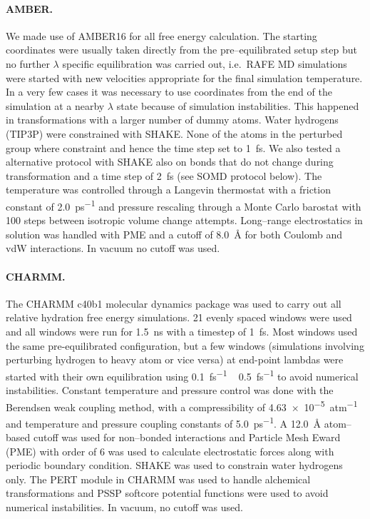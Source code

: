\documentclass[journal=jctcce,manuscript=article]{achemso}
\begin{document}
\paragraph{AMBER.} We made use of AMBER16 for all free energy calculation. The 
starting coordinates were usually taken directly from the pre--equilibrated 
setup step but no further $\lambda$ specific equilibration  was carried out, 
i.e.\ RAFE MD simulations were started with new velocities appropriate for the 
final simulation temperature.  In a very few cases it was necessary to use 
coordinates from the end of the simulation at a nearby $\lambda$ state because 
of simulation instabilities. This happened in transformations with a larger 
number of dummy atoms.  Water hydrogens (TIP3P) were constrained with SHAKE. 
None of the atoms in the perturbed group where constraint and hence the time 
step set to \SI{1}{fs}.  We also tested a alternative protocol with 
SHAKE also on bonds that do not change during transformation and a time step of 
\SI{2}{fs} (see SOMD protocol below). The temperature was controlled through a 
Langevin thermostat with a friction constant of \SI{2.0}{ps^{-1}} and pressure 
rescaling through a Monte Carlo barostat with 100 steps between isotropic 
volume change attempts.  Long--range electrostatics in solution was handled 
with PME and a cutoff of \SI{8.0}{\angstrom} for both Coulomb and vdW 
interactions.  In vacuum no cutoff was used.

\paragraph{CHARMM.} The CHARMM c40b1 molecular dynamics package was used to 
carry out all relative hydration free energy simulations.  21 evenly spaced 
windows were used and all windows were run for \SI{1.5}{ns} with a timestep of 
\SI{1}{fs}.  Most windows used the same pre-equilibrated configuration, but a 
few windows (simulations involving perturbing hydrogen to heavy atom or vice
versa) at end-point lambdas were started with their own equilibration using
\SI{0.1}{fs^{-1}} ~ \SI{0.5}{fs^{-1}} to avoid numerical instabilities.
 Constant temperature and pressure control was done with the Berendsen weak coupling method, with a 
compressibility of \SI{4.63e-5}{atm^{-1}} and temperature and pressure coupling 
constants of \SI{5.0}{ps^{-1}}.  A \SI{12.0}{\angstrom} atom--based cutoff was 
used for non--bonded interactions and Particle Mesh Eward (PME) with order of 6 
was used to calculate electrostatic forces along with periodic boundary 
condition.  SHAKE was used to constrain water hydrogens only.  The PERT module 
in CHARMM was used to handle alchemical transformations and PSSP 
softcore potential functions were used to avoid numerical instabilities.  In
vacuum, no cutoff was used.
\end{document}
